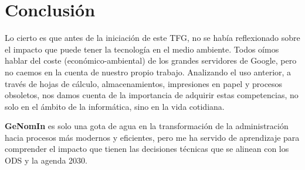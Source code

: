\section{Conclusión}

Lo cierto es que antes de la iniciación de este \acrshort{TFG}, no se había reflexionado sobre el impacto que puede tener la tecnología en el medio ambiente. Todos oímos hablar del coste (económico-ambiental) de los grandes servidores de Google, pero no caemos en la cuenta de nuestro propio trabajo.
Analizando el uso anterior, a través de hojas de cálculo, almacenamientos, impresiones en papel y procesos obsoletos, nos damos cuenta de la importancia de adquirir estas competencias, no solo en el ámbito de la informática, sino en la vida cotidiana.

\textbf{GeNomIn} es solo una gota de agua en la transformación de la administración hacia procesos más modernos y eficientes, pero me ha servido de aprendizaje para comprender el impacto que tienen las decisiones técnicas que se alinean con los \acrshort{ODS} y la agenda 2030.